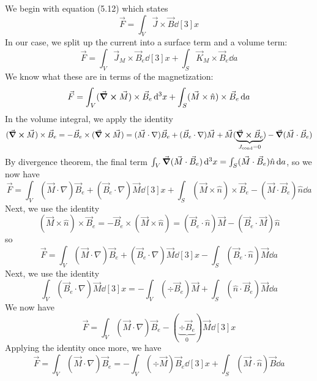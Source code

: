 \documentclass[a4paper,twoside]{article}
\begin{document}
\begin{problem}
    We begin with equation (5.12) which states
    \begin{equation}
        \vec{F} = \int_V \vec{J} \times \vec{B} \dd[3]{x}
    \end{equation}
    In our case, we split up the current into a surface term and a volume term:
    \begin{equation}
        \vec{F} = \int_V \vec{J}_M \times \vec{B}_e \dd[3]{x} + \int_S \vec{K}_M \times \vec{B}_e \dd{a}
    \end{equation}
    We know what these are in terms of the magnetization:
    \begin{equation}
        \vec{F} = \int_V (\curl{ \vec{M}}) \times \vec{B}_e \dd[3]{x} + \int_S ( \vec{M} \times \hat{n}) \times \vec{B}_e \dd{a}
    \end{equation}
    In the volume integral, we apply the identity
    \begin{equation}
        (\curl{ \vec{M}}) \times \vec{B}_e = - \vec{B}_e \times (\curl{ \vec{M}}) = ( \vec{M} \cdot \nabla) \vec{B}_e + ( \vec{B}_e \cdot \nabla) \vec{M} + \vec{M} (\underbrace{ \curl{\vec{B}_e}}_{J_\text{cond} =0}) - \grad{(\vec{M} \cdot \vec{B}_e)}
    \end{equation}
    By divergence theorem, the final term $ \int_V \grad{( \vec{M} \cdot \vec{B}_e)} \dd[3]{x} = \int_S ( \vec{M} \cdot \vec{B}_e) \hat{n} \dd{a} $, so we now have
    \begin{equation}
        \vec{F} = \int_V ( \vec{M} \cdot \nabla) \vec{B}_e + ( \vec{B}_e \cdot \nabla) \vec{M} \dd[3]{x} + \int_S ( \vec{M} \times \hat{n}) \times \vec{B}_e - ( \vec{M} \cdot \vec{B}_e) \hat{n} \dd{a}
    \end{equation}
    Next, we use the identity
    \begin{equation}
        ( \vec{M} \times \hat{n}) \times \vec{B}_e = - \vec{B}_e \times ( \vec{M} \times \hat{n}) = ( \vec{B}_e \cdot \hat{n}) \vec{M} - ( \vec{B}_e \cdot \vec{M}) \hat{n}
    \end{equation}
    so
    \begin{equation}
        \vec{F} = \int_V ( \vec{M} \cdot \nabla) \vec{B}_e + ( \vec{B}_e \cdot \nabla) \vec{M} \dd[3]{x} - \int_S ( \vec{B}_e \cdot \hat{n}) \vec{M} \dd{a} 
    \end{equation}
    Next, we use the identity
    \begin{equation}
        \int_V ( \vec{B}_e \cdot \nabla) \vec{M} \dd[3]{x} = - \int_V (\div{ \vec{B}_e}) \vec{M} + \int_S ( \hat{n} \cdot \vec{B}_e) \vec{M}\dd{a}
    \end{equation}
    We now have
    \begin{equation}
        \vec{F} = \int_V ( \vec{M} \cdot \nabla) \vec{B}_e - (\underbrace{\div{ \vec{B}_e}}_{0}) \vec{M} \dd[3]{x}
    \end{equation}
    Applying the identity once more, we have
    \begin{equation}
        \vec{F} = \int_V ( \vec{M} \cdot \nabla) \vec{B}_e = -\int_V (\div{ \vec{M}}) \vec{B}_e \dd[3]{x} + \int_S ( \vec{M} \cdot \hat{n}) \vec{B}\dd{a} 
    \end{equation}

\end{problem}
\end{document}
